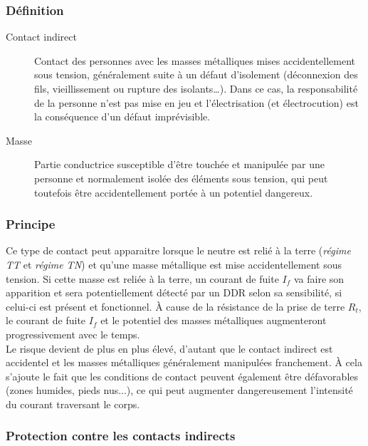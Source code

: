 \subsubsection{Définition}

\begin{description}
\item[Contact indirect] Contact des personnes avec les masses métalliques mises accidentellement sous tension, généralement suite à un défaut d'isolement (déconnexion des fils, vieillissement ou rupture des isolants\ldots). Dans ce cas, la responsabilité de la personne n'est pas mise en jeu et l'électrisation (et électrocution) est la conséquence d'un défaut imprévisible.
\item[Masse] Partie conductrice susceptible d'être touchée et manipulée par une personne et normalement isolée des éléments sous tension, qui peut toutefois être accidentellement portée à un potentiel dangereux.
\end{description}

\subsubsection{Principe}



Ce type de contact peut apparaitre lorsque le neutre est relié à la terre (\emph{régime TT} et \emph{régime TN}) et qu'une masse métallique est mise accidentellement sous tension. Si cette masse est reliée à la terre, un courant de fuite $I_f$ va faire son apparition et sera potentiellement détecté par un DDR selon sa sensibilité, si celui-ci est présent et fonctionnel. \`A cause de la résistance de la prise de terre $R_t$, le courant de fuite $I_f$ et le potentiel des masses métalliques augmenteront progressivement avec le temps.\\

Le risque devient de plus en plus élevé, d'autant que le contact indirect est accidentel et les masses métalliques généralement manipulées franchement. \`A cela s'ajoute le fait que les conditions de contact peuvent également être défavorables (zones humides, pieds nus...), ce qui peut augmenter dangereusement l'intensité du courant traversant le corps.

\subsubsection{Protection contre les contacts indirects}

